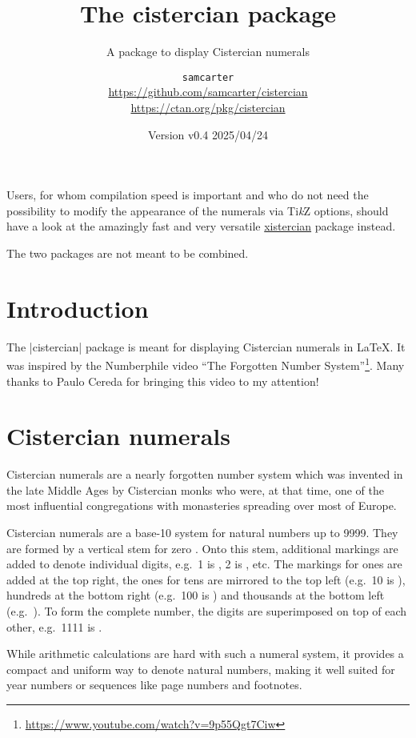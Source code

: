 \documentclass{scrartcl}
\title{The cistercian package}
\subtitle{A package to display Cistercian numerals}
\author{%
  \texorpdfstring{
    \texttt{samcarter}\\
    \url{https://github.com/samcarter/cistercian}\\
    \url{https://ctan.org/pkg/cistercian}
  }{samcarter}}
\date{Version v0.4 \textendash{} 2025/04/24}
\begin{document}
\maketitle
\thispagestyle{scrheadings}

\begin{tcolorbox}[width=.8\textwidth,center,sidebyside=false,title={Note}]
Users, for whom compilation speed is important and who do not need the possibility to modify the appearance of the numerals via Ti\emph{k}Z options, should have a look at the amazingly fast and very versatile \href{https://ctan.org/pkg/xistercian}{xistercian} package instead.

The two packages are not meant to be combined.
\end{tcolorbox}

\section{Introduction}

The \saminline|cistercian| package is meant for displaying Cistercian numerals in \LaTeX{}.
It was inspired by the Numberphile video ``The Forgotten Number System''\footnote{\url{https://www.youtube.com/watch?v=9p55Qgt7Ciw}}. Many thanks to Paulo Cereda for bringing this video to my attention!

\blurb

\section{Cistercian numerals}

Cistercian numerals are a nearly forgotten number system which was invented in the late Middle Ages by Cistercian monks who were, at that time, one of the most influential congregations with monasteries spreading over most of Europe.

Cistercian numerals are a base-10 system for natural numbers up to 9999.
They are formed by a vertical stem for zero .
Onto this stem, additional markings are added to denote individual digits, e.g.\ 1 is , 2 is , etc.
The markings for ones are added at the top right, the ones for tens are mirrored to the top left (e.g.\ 10 is ), hundreds at the bottom right (e.g.\ 100 is ) and thousands at the bottom left (e.g.\ ).
To form the complete number, the digits are superimposed on top of each other, e.g.\ 1111 is .

While arithmetic calculations are hard with such a numeral system, it provides a compact and uniform way to denote natural numbers, making it well suited for year numbers or sequences like page numbers and footnotes. 
\end{document}
